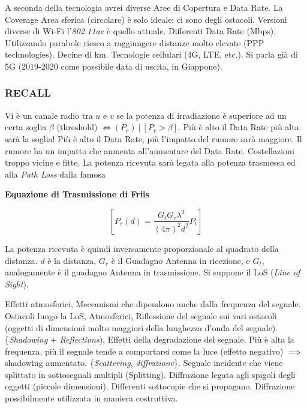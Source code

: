 A seconda della tecnologia avrei diverse Aree di Copertura e Data Rate. La Coverage Area sferica (circolare) è solo ideale: ci sono degli ostacoli. Versioni diverse di Wi-Fi l'\textit{802.11ae} è quello attuale. Differenti Data Rate (Mbps). Utilizzando parabole riesco a raggiungere distanze molto elevate (PPP technologies). Decine di km. Tecnologie cellulari (4G, LTE, etc.). Si parla già di 5G (2019-2020 come possibile data di uscita, in Giappone).

\subsubsection{RECALL}

Vi è un canale radio tra $u$ e $v$ se la potenza di irradiazione è superiore ad un certa soglia $\beta$ (threshold) $\iff (P_r)\ |\ [P_r > \beta]$. Più è alto il Data Rate più alta sarà la soglia! Più è alto il Data Rate, più l'impatto del rumore sarà maggiore. Il rumore ha un impatto che aumenta all'aumentare del Data Rate. Costellazioni troppo vicine e fitte. La potenza ricevuta sarà legata alla potenza trasmessa ed alla \textit{Path Loss} dalla famosa

\begin{defn}{\textbf{Equazione di Trasmissione di Friis}}

\[
	[P_r(d) = \frac{G_tG_r\lambda^2}{(4\pi)^2 d^2}P_t]
\]

\end{defn}

La potenza ricevuta è quindi inversamente proporzionale al quadrato della distanza. $d$ è la distanza, $G_r$ è il Guadagno Antenna in ricezione, e $G_t$, analogamente è il guadagno Antenna in trasmissione. Si suppone il LoS (\textit{Line of Sight}).

Effetti atmosferici, Meccanismi che dipendono anche dalla frequenza del segnale. Ostacoli lungo la LoS, Atmosferici, Riflessione del segnale sui vari ostacoli (oggetti di dimensioni molto maggiori della lunghezza d'onda del segnale). \{\textit{Shadowing} + \textit{Reflections}). Effetti della degradazione del segnale. Più è alta la frequenza, più il segnale tende a comportarsi come la luce (effetto negativo) $\implies$ shadowing aumentato. \{\textit{Scattering}, \textit{diffrazione}\}. Segnale incidente che viene splittato in sottosegnali multipli (Splitting). Diffrazione legata agli spigoli degli oggetti (piccole dimensioni). Differenti sottocopie che si propagano. Diffrazione possibilmente utilizzata in maniera costruttiva.

